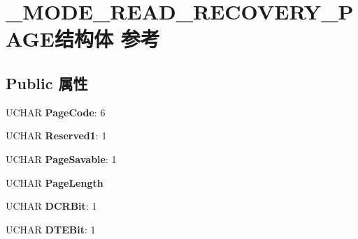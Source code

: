\hypertarget{struct___m_o_d_e___r_e_a_d___r_e_c_o_v_e_r_y___p_a_g_e}{}\section{\+\_\+\+M\+O\+D\+E\+\_\+\+R\+E\+A\+D\+\_\+\+R\+E\+C\+O\+V\+E\+R\+Y\+\_\+\+P\+A\+G\+E结构体 参考}
\label{struct___m_o_d_e___r_e_a_d___r_e_c_o_v_e_r_y___p_a_g_e}
\subsection*{Public 属性}
\begin{DoxyCompactItemize}
\item 
\mbox{\label{struct___m_o_d_e___r_e_a_d___r_e_c_o_v_e_r_y___p_a_g_e_a3e98ebe402509fd209246cb3dd7a485a}} 
U\+C\+H\+AR {\bfseries Page\+Code}\+: 6
\item 
\mbox{\label{struct___m_o_d_e___r_e_a_d___r_e_c_o_v_e_r_y___p_a_g_e_a9b6f6e5019e2c4515a7f245bea2873cf}} 
U\+C\+H\+AR {\bfseries Reserved1}\+: 1
\item 
\mbox{\label{struct___m_o_d_e___r_e_a_d___r_e_c_o_v_e_r_y___p_a_g_e_abee020844216f63e5811dab55f88f1a5}} 
U\+C\+H\+AR {\bfseries Page\+Savable}\+: 1
\item 
\mbox{\label{struct___m_o_d_e___r_e_a_d___r_e_c_o_v_e_r_y___p_a_g_e_a4b139b92c065c3c5c4fdb5f52bbe3aaa}} 
U\+C\+H\+AR {\bfseries Page\+Length}
\item 
\mbox{\label{struct___m_o_d_e___r_e_a_d___r_e_c_o_v_e_r_y___p_a_g_e_a6f923c2df4905097742c5467696e0ad8}} 
U\+C\+H\+AR {\bfseries D\+C\+R\+Bit}\+: 1
\item 
\mbox{\label{struct___m_o_d_e___r_e_a_d___r_e_c_o_v_e_r_y___p_a_g_e_a2db2cd651c177c475b1bbd3e373248fa}} 
U\+C\+H\+AR {\bfseries D\+T\+E\+Bit}\+: 1
\item 

\end{DoxyCompactItemize}
